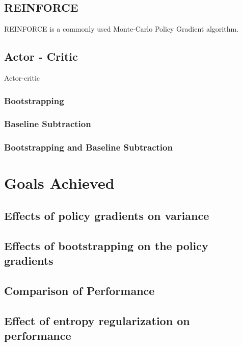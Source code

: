 \documentclass{article}
\begin{document}
\subsection{REINFORCE}
REINFORCE is a commonly used Monte-Carlo Policy Gradient algorithm. 
\subsection{Actor - Critic}
Actor-critic 
\subsubsection{Bootstrapping}
\subsubsection{Baseline Subtraction}
\subsubsection{Bootstrapping and Baseline Subtraction}

\section{Goals Achieved}
\subsection{Effects of policy gradients on variance}
\subsection{Effects of bootstrapping on the policy gradients}
\subsection{Comparison of Performance}
\subsection{Effect of entropy regularization on performance}
\end{document}
